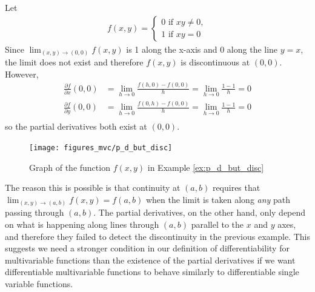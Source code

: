 \documentclass[12pt,letterpaper,reqno]{article}
\numberwithin{equation}{section}
\begin{document}
{\begin{example}\label{ex:p_d_but_disc}
	Let
	\begin{align*}
		f(x,y)=\begin{cases}
			0 \text{ if } xy \neq 0, \\
			1 \text{ if } xy=0
		\end{cases}
	\end{align*}
Since $\lim_{(x,y) \to (0,0)}f(x,y)$ is 1 along the x-axis and $0$ along the line $y=x$, the limit does not exist and therefore $f(x,y)$ is discontinuous at $(0,0)$. However,
	\begin{align*}
		\frac{\partial f}{\partial x}(0,0)&=\lim_{h \to 0}\frac{f(h,0)-f(0,0)}{h}=\lim_{h \to 0}\frac{1-1}{h}=0 \\
		\frac{\partial f}{\partial y}(0,0)&=\lim_{h \to 0}\frac{f(0,h)-f(0,0)}{h}=\lim_{h \to 0}\frac{1-1}{h}=0 \\
	\end{align*}
so the partial derivatives both exist at $(0,0)$. 
\begin{figure}[h]
	\begin{center}
		\texttt{[image: figures\_mvc/p\_d\_but\_disc]}
	\end{center}
	\caption{Graph of the function $f(x,y)$ in Example \ref{ex:p_d_but_disc}}
\end{figure}
\end{example}
The reason this is possible is that continuity at $(a,b)$ requires that $\lim_{(x,y) \to (a,b)}f(x,y)=f(a,b)$ when the limit is taken along \emph{any} path passing through $(a,b)$. The partial derivatives, on the other hand, only depend on what is happening along lines through $(a,b)$ parallel to the $x$ and $y$ axes, and therefore they failed to detect the discontinuity in the previous example. This suggests we need a stronger condition in our definition of differentiability for multivariable functions than the existence of the partial derivatives if we want differentiable multivariable functions to behave similarly to differentiable single variable functions.

}
\end{document}
